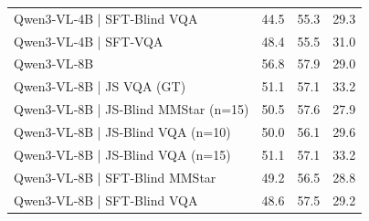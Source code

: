 \begin{tabular}{lrrr}
Qwen3‑VL‑4B | SFT‑Blind VQA & 44.5 & 55.3 & 29.3 \\
Qwen3‑VL‑4B | SFT‑VQA & 48.4 & 55.5 & 31.0 \\
Qwen3‑VL‑8B & 56.8 & 57.9 & 29.0 \\
Qwen3‑VL‑8B | JS VQA (GT) & 51.1 & 57.1 & 33.2 \\
Qwen3‑VL‑8B | JS‑Blind MMStar (n=15) & 50.5 & 57.6 & 27.9 \\
Qwen3‑VL‑8B | JS‑Blind VQA (n=10) & 50.0 & 56.1 & 29.6 \\
Qwen3‑VL‑8B | JS‑Blind VQA (n=15) & 51.1 & 57.1 & 33.2 \\
Qwen3‑VL‑8B | SFT‑Blind MMStar & 49.2 & 56.5 & 28.8 \\
Qwen3‑VL‑8B | SFT‑Blind VQA & 48.6 & 57.5 & 29.2 \\
\bottomrule
\end{tabular}
